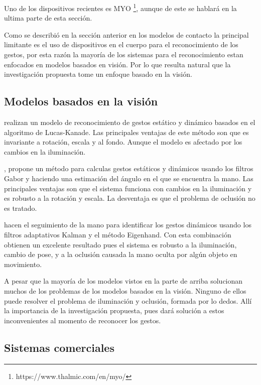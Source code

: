 Uno de los dispositivos recientes es MYO \footnote{https://www.thalmic.com/en/myo/}, aunque de este se hablar\'a en la ultima parte de esta secci\'on. 

Como se describi\'o en la secci\'on anterior en los modelos de contacto la principal limitante es el uso de dispositivos en el cuerpo para el reconocimiento de los gestos, por esta raz\'on la mayor\'ia de los sistemas para el reconocimiento estan enfocados en modelos basados en visi\'on. Por lo que resulta natural que la investigaci\'on propuesta tome un enfoque basado en la visi\'on.

\subsection{Modelos basados en la visi\'on}  

\cite{Premaratne2013} realizan un modelo de reconocimiento de gestos est\'atico y din\'amico basados en el algoritmo de Lucas-Kanade. Las principales ventajas de este m\'etodo son que es invariante a rotaci\'on, escala y al fondo. Aunque el modelo es afectado por los cambios en la iluminaci\'on.

\citep{Huang2011}, propone un método para calculas gestos estáticos y dinámicos usando los filtros Gabor y haciendo una estimación del \'angulo en el que se encuentra la mano. Las principales ventajas son que el sistema funciona con cambios en la iluminaci\'on y es robusto a la rotaci\'on y escala. La desventaja es que el problema de oclusi\'on no es tratado.

\citep{MohdAsaari2014} hacen el seguimiento de la mano para identificar los gestos din\'amicos usando los filtros adaptativos Kalman y el m\'etodo Eigenhand. Con esta combinaci\'on obtienen un excelente resultado pues el sistema es robusto a la iluminaci\'on, cambio de pose, y a la oclusi\'on causada la mano oculta por alg\'un objeto en movimiento. 

 

A pesar que la mayoría de los modelos vistos en la parte de arriba solucionan muchos de los problemas de los modelos basados en la visi\'on. Ninguno de ellos puede resolver el problema de iluminaci\'on y oclusi\'on, formada por lo dedos. All\'i la importancia de la investigaci\'on propuesta, pues dar\'a soluci\'on a estos inconvenientes al momento de reconocer los gestos.
 
\subsection{Sistemas comerciales}

